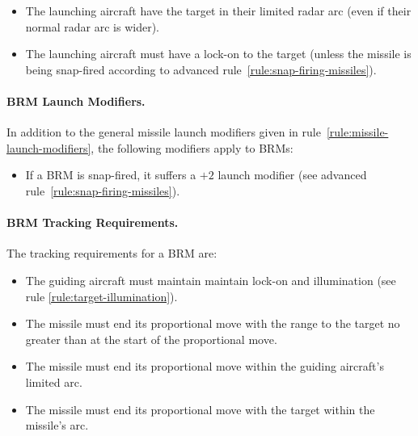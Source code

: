 {\begin{itemize}

    \item The launching aircraft have the target in their limited radar arc (even if their normal radar arc is wider).

    \item The launching aircraft must have a lock-on to the target (unless the missile is being snap-fired according to advanced rule~\ref{rule:snap-firing-missiles}).

\end{itemize}

\paragraph{BRM Launch Modifiers.}
\label{rule:brm-launch-modifiers}

In addition to the general missile launch modifiers given in rule~\ref{rule:missile-launch-modifiers}, the following modifiers apply to BRMs:

\begin{itemize}
    \item If a BRM is snap-fired, it suffers a $+2$ launch modifier (see advanced rule~\ref{rule:snap-firing-missiles}).
\end{itemize}

\paragraph{BRM Tracking Requirements.} 
\label{rule:brm-tracking-requirements}

The tracking requirements for a BRM are:

\begin{itemize}

    \item The guiding aircraft must maintain maintain lock-on and illumination (see rule \ref{rule:target-illumination}).

    \item The missile must end its proportional move with the range to the target no greater than at the start of the proportional move.

    \item The missile must end its proportional move within the guiding aircraft's limited arc.

    \item The missile must end its proportional move with the target within the missile's  arc.

\end{itemize}



}


